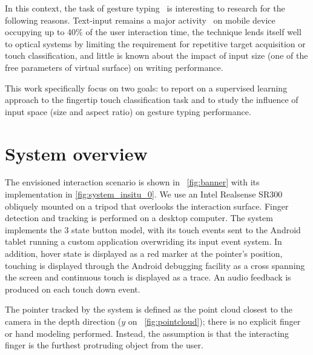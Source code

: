 \documentclass{chi-ext}
\begin{document}


In this context, the task of gesture typing~\cite{Kristensson2004} is interesting to research for the following reasons. Text-input remains a major activity~\cite{McGregor2014} on mobile device occupying up to 40\% of the user interaction time, the technique lends itself well to optical systems by limiting the requirement for repetitive target acquisition or touch classification, and little is known about the impact of input size (one of the free parameters of virtual surface) on writing performance.

This work specifically focus on two goals: to report on a supervised learning approach to the fingertip touch classification task and to study the influence of input space (size and aspect ratio) on gesture typing performance.

\section{System overview}
The envisioned interaction scenario is shown in ~\autoref{fig:banner} with its implementation in \autoref{fig:system_insitu_0}. We use an Intel Realsense SR300 obliquely mounted on a tripod that overlooks the interaction surface. Finger detection and tracking is performed on a desktop computer. The system implements the 3 state button model, with its touch events sent to the Android tablet running a custom application overwriding its input event system. In addition, hover state is displayed as a red marker at the pointer’s position, touching is displayed through the Android debugging facility as a cross spanning the screen and continuous touch is displayed as a trace. An audio feedback is produced on each touch down event.

The pointer tracked by the system is defined as the point cloud closest to the camera in the depth direction ($y$ on ~\autoref{fig:pointcloud}); there is no explicit finger or hand modeling performed. Instead, the assumption is that the interacting finger is the furthest protruding object from the user.
\end{document}

